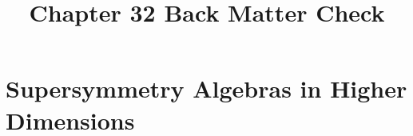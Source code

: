 \documentclass[11pt,a4paper]{article}
\title{Chapter 32 Back Matter Check}
\author{}
\numberwithin{equation}{subsection}
\begin{document}
\maketitle
\setcounter{section}{31}
\section{Supersymmetry Algebras in Higher Dimensions}

\end{document}
